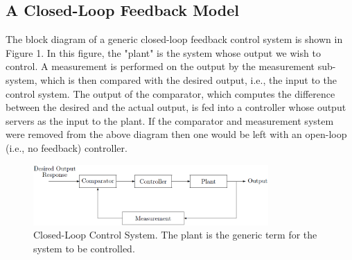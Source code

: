 \documentclass[a4paper]{article}
\begin{document}
\subsection{A Closed-Loop Feedback Model}
The block diagram of a generic closed-loop feedback control system is shown in Figure 1. In this figure, the "plant" is the system whose output we wish to control. A measurement is performed on the output by the measurement sub-system, which is then compared with the desired output, i.e., the input to the control system. The output of the comparator, which computes the difference between the desired and the actual output, is fed into a controller whose output servers as the input to the plant. If the comparator and measurement system were removed from the above diagram then one would be left with an open-loop (i.e., no feedback) controller.
\begin{figure}[H]
    \begin{center}
        \includegraphics[width=0.8\textwidth]{1.png}
    \end{center}
    \caption{Closed-Loop Control System. The plant is the generic term for the system to be controlled.}
\end{figure}
\end{document}

